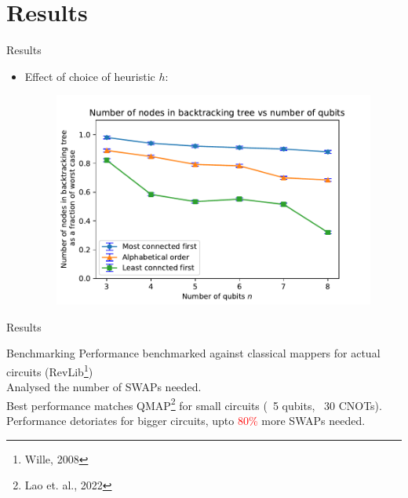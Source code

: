 \documentclass{beamer}
\begin{document}
\section{Results}
\begin{frame}{Results}\pause
\begin{itemize}
	\item Effect of choice of heuristic $h$:\\
	\begin{figure}
	\centering
		\includegraphics[scale=0.6]{figures/heuristic} 
	\end{figure}
\end{itemize}
\end{frame}

\begin{frame}{Results}
\begin{block}{Benchmarking}\pause
Performance benchmarked against classical mappers for actual circuits (RevLib\footnote{Wille, 2008}) \pause \\
Analysed the number of SWAPs needed.\\
Best performance matches QMAP\footnote{Lao et. al., 2022} for small circuits (~5 qubits, ~30 CNOTs). \pause \\
Performance detoriates for bigger circuits, upto \textcolor{red}{80\%} more SWAPs needed.
\end{block}
\end{frame}
\end{document}
